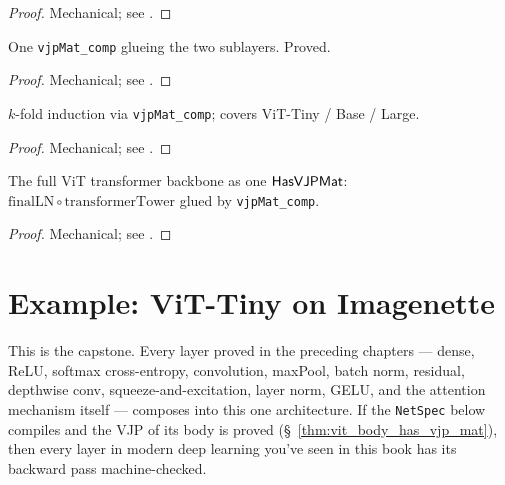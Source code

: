 \begin{proof}
\leanok
Mechanical; see .
\end{proof}

\begin{theorem}
  \label{thm:transformerBlock_has_vjp_mat}
  \leanok
  One \texttt{vjpMat\_comp} glueing the two sublayers. Proved.
\end{theorem}

\begin{proof}
\leanok
Mechanical; see .
\end{proof}

\begin{theorem}
  \label{thm:transformerTower_has_vjp_mat}
  \leanok
  \(k\)-fold induction via \texttt{vjpMat\_comp}; covers ViT-Tiny /
  Base / Large.
\end{theorem}

\begin{proof}
\leanok
Mechanical; see .
\end{proof}

\begin{theorem}
  \label{thm:vit_body_has_vjp_mat}
  \leanok
  The full ViT transformer backbone as one \(\mathsf{HasVJPMat}\):
  \(\mathrm{finalLN} \circ \mathrm{transformerTower}\) glued by
  \texttt{vjpMat\_comp}.
\end{theorem}

\begin{proof}
\leanok
Mechanical; see .
\end{proof}

\section{Example: ViT-Tiny on Imagenette}
\label{sec:attention_vit_example}

This is the capstone. Every layer proved in the preceding chapters
--- dense, ReLU, softmax cross-entropy, convolution, maxPool,
batch norm, residual, depthwise conv, squeeze-and-excitation, layer
norm, GELU, and the attention mechanism itself --- composes into
this one architecture. If the \texttt{NetSpec} below compiles and
the VJP of its body is proved (\S~\ref{thm:vit_body_has_vjp_mat}),
then every layer in modern deep learning you've seen in this book
has its backward pass machine-checked.

